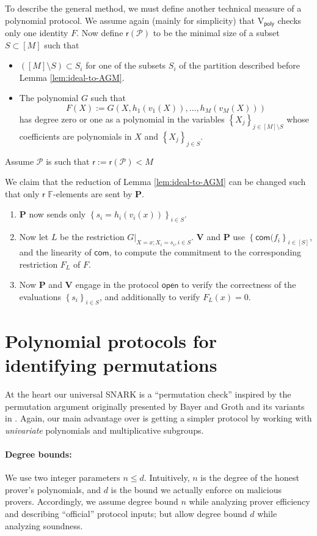 \documentclass[11pt]{article} %
\newcommand{\F}{\ensuremath{\mathbb F}\xspace}
\newcommand{\com}{\ensuremath{\mathsf{com}}\xspace}
\newcommand{\open}{\ensuremath{\mathsf{open}}\xspace}
\newcommand{\reducedelems}{\ensuremath{\mathsf{r}}\xspace}
\newcommand{\defeq}{:=}
\newcommand{\sett}[2]{\ensuremath{\set{#1}_{#2}}\xspace}
\newcommand{\prv}{\ensuremath{\mathsf{\mathbf{P}}}\xspace}
\newcommand{\verpoly}{\ensuremath{\mathrm{V_{\mathsf{poly}}}}\xspace}
\newcommand{\ver}{\ensuremath{\mathsf{\mathbf{V}}}\xspace}
\newcommand{\set}[1]{\ensuremath{\left\{#1\right\}}\xspace}
\newcommand{\prot}{\ensuremath{\mathscr{P}}\xspace}
\begin{document}
To describe the general method, we must define another technical measure of a polynomial protocol. We assume again (mainly for simplicity) that \verpoly checks only one identity $F$.
Now define $\reducedelems(\prot)$ to be the minimal size of a subset $S\subset [M]$ such that 
\begin{itemize}
 \item $([M]\setminus S)\subset S_i$ for one of the subsets $S_i$ of the partition described before Lemma \ref{lem:ideal-to-AGM}.
 \item The polynomial $G$ such that
 \[F(X)\defeq G(X, h_1(v_1(X)),\ldots,h_{M}(v_{M}(X)))\]
has degree zero or one as a polynomial in the variables \sett{X_j}{j\in [M]\setminus S} whose coefficients are polynomials in $X$ and \sett{X_j}{j\in S}. 
\end{itemize}
Assume \prot is such that $\reducedelems \defeq \reducedelems(\prot)<M$

We claim that the reduction of Lemma \ref{lem:ideal-to-AGM} can be changed such that only $\reducedelems$ $\F$-elements are sent by \prv.
\begin{enumerate}
 \item \prv now sends only \sett{s_i=h_i(v_i(x))}{i\in S}.
 \item Now let $L$ be the restriction $G|_{X=x;X_i=s_i, i\in S}$. \ver and \prv use \sett{\com(f_i}{i\in [S]}, and the linearity of \com, to compute the commitment to the corresponding restriction $F_L$ of $F$.
 \item Now \prv and \ver engage in the protocol \open to verify the correctness of the evaluations $\sett{s_i}{i\in S}$, and additionally to verify $F_L(x)=0$.
 
\end{enumerate}


 


\section{Polynomial protocols for identifying permutations}\label{sec:permprotocol}
At the heart our universal SNARK is a ``permutation check'' inspired by the permutation argument originally presented by Bayer and Groth \cite{permorig} and its variants in \cite{Bootle,sonic}. Again, our main advantage over \cite{sonic} is getting a simpler protocol by working with \emph{univariate} polynomials and multiplicative subgroups.


\paragraph{Degree bounds:}
 We use two integer parameters $n\leq d$. Intuitively, $n$ is the degree of the honest prover's polynomials, and $d$ is the bound we actually enforce on malicious provers. Accordingly, we assume degree bound $n$ while analyzing prover efficiency and describing ``official'' protocol inputs; but allow degree bound $d$ while analyzing soundness.
\end{document}
